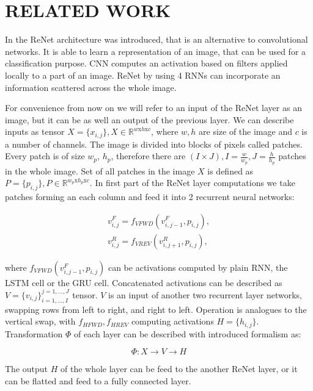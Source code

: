 \documentclass[a4paper, 10 pt, journal]{ieeeconf}
\begin{document}
\section{RELATED WORK}

In \cite{DBLP:journals/corr/VisinKCMCB15} the ReNet architecture was introduced, that is an alternative to convolutional networks. It is able to learn a representation of an image, that can be used for a classification purpose. CNN computes an activation based on filters applied locally to a part of an image. ReNet by using 4 RNNs can incorporate an information scattered across the whole image.

For convenience from now on we will refer to an input of the ReNet layer as an image, but it can be as well an output of the previous layer. We can describe inputs as tensor $X = \{x_{i,j}\}, X \in \mathbb{R}^{w \textrm{x} h \textrm{x} c}$, where $w, h$ are size of the image and $c$ is a number of channels. The image is divided into blocks of pixels called patches. Every patch is of size $w_p$, $h_p$, therefore there are $(I \times J),I=\frac{w}{w_p}, J=\frac{h}{h_p}$ patches in the whole image. Set of all patches in the image $X$ is defined as $P = \{p_{i,j}\}, P \in \mathbb{R}^{w_p \textrm{x} h_p \textrm{x} c}$. In first part of the ReNet layer computations we take patches forming an each column and feed it into 2 recurrent neural networks: 

\begin{gather}
	v_{i,j}^{F} = f_{VFWD} (v_{i,j-1}^F, p_{i,j}), \\
    v_{i,j}^{R} = f_{VREV} (v_{i,j+1}^R, p_{i,j}),
\end{gather}

where $f_{VFWD} (v_{i,j-1}^F, p_{i,j})$ can be activations computed by plain RNN, the LSTM cell or the GRU cell. Concatenated activations can be described as $V = \{v_{i,j}\}_{i=1,...,I}^{j=1,...,J}$ tensor. $V$ is an input of another two recurrent layer networks, swapping rows from left to right, and right to left. Operation is analogues to the vertical swap, with $f_{HFWD}, f_{HREV}$ computing activations $H = \{h_{i,j}\}$. Transformation $\Phi$ of each layer can be described with introduced formalism as:

\begin{equation}
	\Phi: X \rightarrow V \rightarrow H
\end{equation}

The output $H$ of the whole layer can be feed to the another ReNet layer, or it can be flatted and feed to a fully connected layer.
\end{document}
